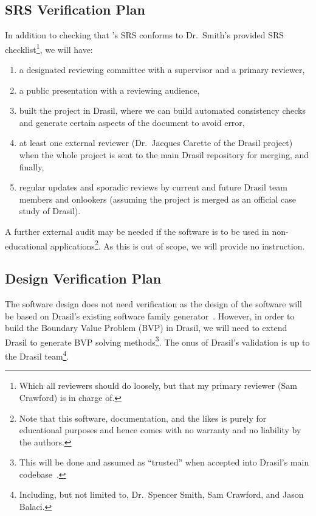 \documentclass[12pt, titlepage]{article}
\begin{document}
\subsection{SRS Verification Plan}
\label{srs-verification-plan}

In addition to checking that \progname{}'s SRS conforms to Dr.\ Smith's provided
SRS checklist\footnote{Which all reviewers should do loosely, but that my
    primary reviewer (Sam Crawford) is in charge of.}, we will have:

\begin{enumerate}

    \item a designated reviewing committee with a supervisor and a primary
          reviewer,

    \item a public presentation with a reviewing audience,

    \item built the project in Drasil, where we can build automated consistency
          checks and generate certain aspects of the document to avoid error,

    \item at least one external reviewer (Dr.\ Jacques Carette of the Drasil
          project) when the whole \progname{} project is sent to the main Drasil
          repository for merging, and finally,

    \item regular updates and sporadic reviews by current and future Drasil team
          members and onlookers (assuming the project is merged as an official
          case study of Drasil).

\end{enumerate}

A further external audit may be needed if the software is to be used in
non-educational applications\footnote{Note that this software, documentation,
    and the likes is purely for educational purposes and hence comes with no
    warranty and no liability by the authors.}. As this is out of scope, we will
provide no instruction.

\subsection{Design Verification Plan}

The software design does not need verification as the design of the software
will be based on Drasil's existing software family generator~\cite{Drasil2023}.
However, in order to build the Boundary Value Problem (BVP) in Drasil, we will
need to extend Drasil to generate BVP solving methods\footnote{This will be done
    and assumed as ``trusted'' when accepted into Drasil's main
    codebase~\cite{Drasil2023}.}. The onus of Drasil's validation is up to the
Drasil team\footnote{Including, but not limited to, Dr.\ Spencer Smith, Sam
    Crawford, and Jason Balaci.}.
\end{document}
